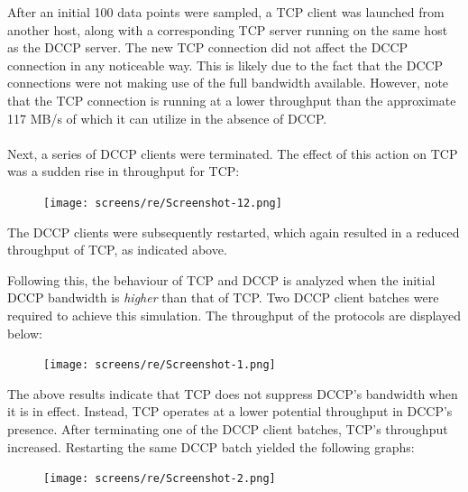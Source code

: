 \documentclass[10pt,a4paper]{article}
\begin{document}
After an initial 100 data points were sampled, a TCP client was launched from another
host, along with a corresponding TCP server running on the same host as the DCCP server. The new TCP connection did not
affect the DCCP connection in any noticeable way. This is likely due to the fact that the DCCP connections were
not making use of the full bandwidth available. However, note that the TCP connection is running at a lower throughput
than the approximate 117 MB/s of which it can utilize in the absence of DCCP.
\paragraph{}
Next, a series of DCCP clients were terminated. The effect of this action on TCP was a sudden rise in throughput for TCP:

\begin{figure}[!h]
\begin{center}
\hspace*{-65pt}
\texttt{[image: screens/re/Screenshot-12.png]}
\end{center}
\end{figure}

The DCCP clients were subsequently restarted, which again resulted in a reduced throughput of TCP, as indicated above.

Following this, the behaviour of TCP and DCCP is analyzed when the initial DCCP
bandwidth
is \emph{higher} than that of TCP. Two DCCP client batches were required to
achieve this simulation. The throughput of the protocols are displayed below:



\begin{figure}[!h]
\begin{center}
\hspace*{-65pt}
\texttt{[image: screens/re/Screenshot-1.png]}
\end{center}
\end{figure}

The above results indicate that TCP does not suppress DCCP's bandwidth when it
is in effect. Instead, TCP operates
at a lower potential throughput in DCCP's presence. After terminating one of
the DCCP client batches, TCP's throughput increased. Restarting the same DCCP
batch yielded the following graphs:

\begin{figure}[!h]
\begin{center}
\hspace*{-65pt}
\texttt{[image: screens/re/Screenshot-2.png]}
\end{center}
\end{figure}
\end{document}
